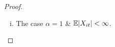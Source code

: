 \documentclass{article}
\begin{document}
\begin{proof}
\begin{enumerate}[i)]
    \item The case $\alpha = 1$ \& $\mathbb{E} |X_{it}| < \infty$.
  \end{enumerate}
  
\end{proof}


\end{document}
